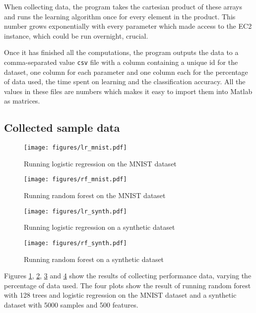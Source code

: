 \documentclass[a4paper,12pt,twoside,openright]{report}
\begin{document}
When collecting data, the program takes the cartesian product of these arrays and runs the learning algorithm once for every element in the product. This number grows exponentially with every parameter which made access to the EC2 instance, which could be run overnight, crucial.

Once it has finished all the computations, the program outputs the data to a comma-separated value \texttt{csv} file with a column containing a unique id for the dataset, one column for each parameter and one column each for the percentage of data used, the time spent on learning and the classification accuracy. All the values in these files are numbers which makes it easy to import them into Matlab as matrices. 

\subsection{Collected sample data}

\begin{figure}
\centering
  \texttt{[image: figures/lr\_mnist.pdf]}
  \caption{Running logistic regression on the MNIST dataset}
  \label{sampledata1}
\end{figure}

\begin{figure}
\centering
  \texttt{[image: figures/rf\_mnist.pdf]}
  \caption{Running random forest on the MNIST dataset}
  \label{sampledata2}
\end{figure}

\begin{figure}
\centering
  \texttt{[image: figures/lr\_synth.pdf]}
  \caption{Running logistic regression on a synthetic dataset}
  \label{sampledata3}
\end{figure}

\begin{figure}
\centering
  \texttt{[image: figures/rf\_synth.pdf]}
  \caption{Running random forest on a synthetic dataset}
  \label{sampledata4}
\end{figure}



Figures \ref{sampledata1}, \ref{sampledata2}, \ref{sampledata3} and \ref{sampledata4} show the results of collecting performance data, varying the percentage of data used. The four plots show the result of running random forest with 128 trees and logistic regression on the MNIST dataset and a synthetic dataset with 5000 samples and 500 features.
\end{document}
